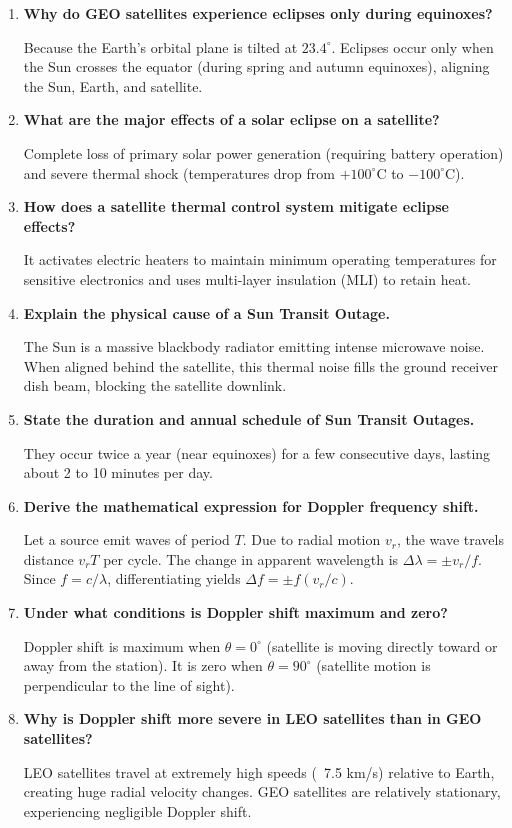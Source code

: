\documentclass[12pt,a4paper]{article}
\newcommand{\Q}[1]{\textbf{#1}\par\noindent\ignorespaces}
\begin{document}
\begin{tcolorbox}[exambox, title={\textbf{Frequently Asked / Viva Questions}}]
\begin{enumerate}[topsep=0pt, label=\textbf{Q\arabic*.}, itemsep=5pt]
  \item \Q{Why do GEO satellites experience eclipses only during equinoxes?}
    Because the Earth's orbital plane is tilted at $23.4^\circ$. Eclipses occur only when the Sun crosses the equator (during spring and autumn equinoxes), aligning the Sun, Earth, and satellite.
  \item \Q{What are the major effects of a solar eclipse on a satellite?}
    Complete loss of primary solar power generation (requiring battery operation) and severe thermal shock (temperatures drop from $+100^\circ\text{C}$ to $-100^\circ\text{C}$).
  \item \Q{How does a satellite thermal control system mitigate eclipse effects?}
    It activates electric heaters to maintain minimum operating temperatures for sensitive electronics and uses multi-layer insulation (MLI) to retain heat.
  \item \Q{Explain the physical cause of a Sun Transit Outage.}
    The Sun is a massive blackbody radiator emitting intense microwave noise. When aligned behind the satellite, this thermal noise fills the ground receiver dish beam, blocking the satellite downlink.
  \item \Q{State the duration and annual schedule of Sun Transit Outages.}
    They occur twice a year (near equinoxes) for a few consecutive days, lasting about 2 to 10 minutes per day.
  \item \Q{Derive the mathematical expression for Doppler frequency shift.}
    Let a source emit waves of period $T$. Due to radial motion $v_r$, the wave travels distance $v_r T$ per cycle. The change in apparent wavelength is $\Delta \lambda = \pm v_r / f$. Since $f = c/\lambda$, differentiating yields $\Delta f = \pm f(v_r/c)$.
  \item \Q{Under what conditions is Doppler shift maximum and zero?}
    Doppler shift is maximum when $\theta = 0^\circ$ (satellite is moving directly toward or away from the station). It is zero when $\theta = 90^\circ$ (satellite motion is perpendicular to the line of sight).
  \item \Q{Why is Doppler shift more severe in LEO satellites than in GEO satellites?}
    LEO satellites travel at extremely high speeds (~7.5 km/s) relative to Earth, creating huge radial velocity changes. GEO satellites are relatively stationary, experiencing negligible Doppler shift.

\end{enumerate}
\end{tcolorbox}
\end{document}
